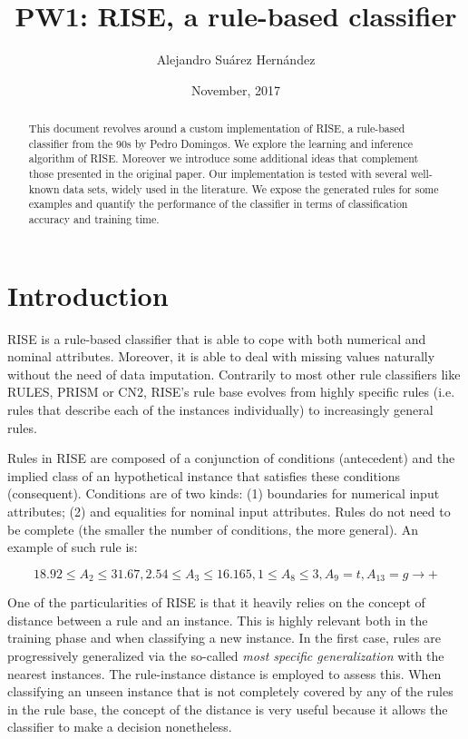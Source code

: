 \documentclass[a4paper]{article}
\title{PW1: RISE, a rule-based classifier}
\author{Alejandro Su\'arez Hern\'andez}
\date{November, 2017}
\begin{document}
\maketitle

\begin{abstract}
This document revolves around a custom implementation of RISE, a rule-based classifier from the 90s by Pedro Domingos. We explore the learning and inference algorithm of RISE. Moreover we introduce some additional ideas that complement those presented in the original paper. Our implementation is tested with several well-known data sets, widely used in the literature. We expose the generated rules for some examples and quantify the performance of the classifier in terms of classification accuracy and training time.
\end{abstract}

\section{Introduction}

RISE \cite{domingos1996unifying} is a rule-based classifier that is able to cope with both numerical and nominal attributes. Moreover, it is able to deal with missing values naturally without the need of data imputation. Contrarily to most other rule classifiers like RULES, PRISM or CN2, RISE's rule base evolves from highly specific rules (i.e. rules that describe each of the instances individually) to increasingly general rules.

Rules in RISE are composed of a conjunction of conditions (antecedent) and the implied class of an hypothetical instance that satisfies these conditions (consequent). Conditions are of two kinds: (1) boundaries for numerical input attributes; (2) and equalities for nominal input attributes. Rules do not need to be complete (the smaller the number of conditions, the more general). An example of such rule is:

\[ 18.92 \le A_2 \le 31.67, 2.54 \le A_3 \le 16.165, 1 \le A_8 \le 3, A_9=t, A_{13} = g \rightarrow + \]

One of the particularities of RISE is that it heavily relies on the concept of distance between a rule and an instance. This is highly relevant both in the training phase and when classifying a new instance. In the first case, rules are progressively generalized via the so-called \emph{most specific generalization} with the nearest instances. The rule-instance distance is employed to assess this. When classifying an unseen instance that is not completely covered by any of the rules in the rule base, the concept of the distance is very useful because it allows the classifier to make a decision nonetheless.
\end{document}
